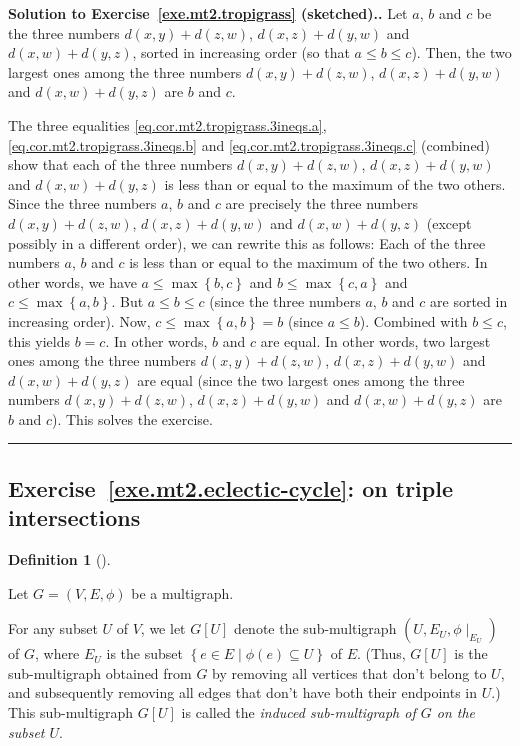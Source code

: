 \documentclass[numbers=enddot,12pt,final,onecolumn,notitlepage]{scrartcl}%
\newcounter{exer}
\theoremstyle{definition}
\newtheorem{defi}[theo]{Definition}
\newenvironment{definition}[1][]
{\begin{defi}[#1]\begin{leftbar}}
{\end{leftbar}\end{defi}}
\newenvironment{proof}[1][Proof]{\noindent\textbf{#1.} }{\ \rule{0.5em}{0.5em}}
\newcommand{\set}[1]{\left\{ #1 \right\}}
\newcommand{\tup}[1]{\left( #1 \right)}
\newcommand{\ive}[1]{\left[ #1 \right]}
\begin{document}
\begin{proof}[Solution to Exercise~\ref{exe.mt2.tropigrass}
(sketched).]
Let $a$, $b$ and $c$ be the three numbers
$d \tup{x, y} + d \tup{z, w}$,
$d \tup{x, z} + d \tup{y, w}$ and
$d \tup{x, w} + d \tup{y, z}$,
sorted in increasing order (so that
$a \leq b \leq c$).
Then, the two largest ones among the three numbers
$d \tup{x, y} + d \tup{z, w}$,
$d \tup{x, z} + d \tup{y, w}$ and
$d \tup{x, w} + d \tup{y, z}$
are $b$ and $c$.

The three equalities
\eqref{eq.cor.mt2.tropigrass.3ineqs.a},
\eqref{eq.cor.mt2.tropigrass.3ineqs.b} and
\eqref{eq.cor.mt2.tropigrass.3ineqs.c} (combined)
show that each of the three numbers
$d \tup{x, y} + d \tup{z, w}$,
$d \tup{x, z} + d \tup{y, w}$ and
$d \tup{x, w} + d \tup{y, z}$ is less than or
equal to the maximum of the two others.
Since the three numbers $a$, $b$ and $c$ are
precisely the three numbers
$d \tup{x, y} + d \tup{z, w}$,
$d \tup{x, z} + d \tup{y, w}$ and
$d \tup{x, w} + d \tup{y, z}$ (except possibly
in a different order), we can rewrite this
as follows:
Each of the three numbers $a$, $b$ and $c$ is less than or
equal to the maximum of the two others.
In other words, we have $a \leq \max \set{b, c}$ and
$b \leq \max \set{c, a}$ and $c \leq \max \set{a, b}$.
But $a \leq b \leq c$ (since the three numbers $a$, $b$ and
$c$ are sorted in increasing order).
Now, $c \leq \max \set{a, b} = b$ (since $a \leq b$).
Combined with $b \leq c$, this yields $b = c$.
In other words, $b$ and $c$ are equal.
In other words, two largest ones among the three numbers
$d \tup{x, y} + d \tup{z, w}$,
$d \tup{x, z} + d \tup{y, w}$ and
$d \tup{x, w} + d \tup{y, z}$ are equal
(since the two largest ones among the three numbers
$d \tup{x, y} + d \tup{z, w}$,
$d \tup{x, z} + d \tup{y, w}$ and
$d \tup{x, w} + d \tup{y, z}$
are $b$ and $c$).
This solves the exercise.
\end{proof}

\subsection{Exercise~\ref{exe.mt2.eclectic-cycle}:
on triple intersections}

\begin{definition}
Let $G = \tup{V, E, \phi}$ be a multigraph.

For any subset $U$ of $V$, we let $G \ive{U}$ denote the
sub-multigraph $\tup{U, E_U, \phi\mid_{E_U}}$ of $G$, where
$E_U$ is the subset $\set{e \in E \mid \phi \tup{e} \subseteq U}$ of
$E$.
(Thus, $G \ive{U}$ is the sub-multigraph obtained from $G$ by removing
all vertices that don't belong to $U$, and subsequently removing all
edges that don't have both their endpoints in $U$.)
This sub-multigraph $G \ive{U}$ is called the \textit{induced
sub-multigraph of $G$ on the subset $U$}.
\end{definition}
\end{document}
